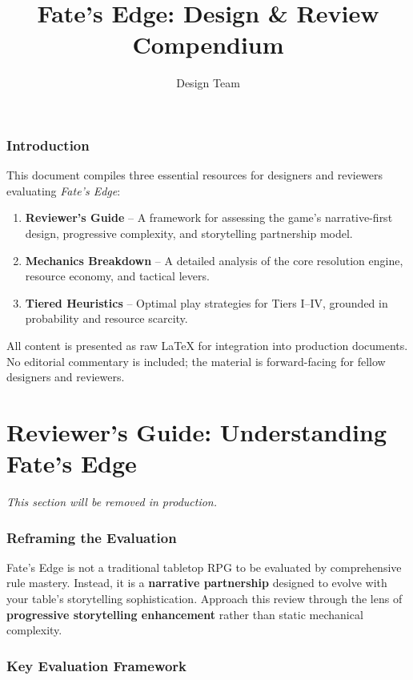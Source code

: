 \documentclass[11pt]{article}
\title{Fate's Edge: Design \& Review Compendium}
\author{Design Team}
\date{}
\begin{document}
\maketitle
\tableofcontents
\newpage

\section*{Introduction}
This document compiles three essential resources for designers and reviewers evaluating \textit{Fate's Edge}:
\begin{enumerate}
    \item \textbf{Reviewer's Guide} – A framework for assessing the game's narrative-first design, progressive complexity, and storytelling partnership model.
    \item \textbf{Mechanics Breakdown} – A detailed analysis of the core resolution engine, resource economy, and tactical levers.
    \item \textbf{Tiered Heuristics} – Optimal play strategies for Tiers I–IV, grounded in probability and resource scarcity.
\end{enumerate}

All content is presented as raw LaTeX for integration into production documents. No editorial commentary is included; the material is forward-facing for fellow designers and reviewers.

\newpage

\part{Reviewer's Guide: Understanding Fate's Edge}

\textit{This section will be removed in production.}

\section{Reframing the Evaluation}

Fate's Edge is not a traditional tabletop RPG to be evaluated by comprehensive rule mastery. Instead, it is a \textbf{narrative partnership} designed to evolve with your table's storytelling sophistication. Approach this review through the lens of \textbf{progressive storytelling enhancement} rather than static mechanical complexity.

\section{Key Evaluation Framework}
\end{document}
